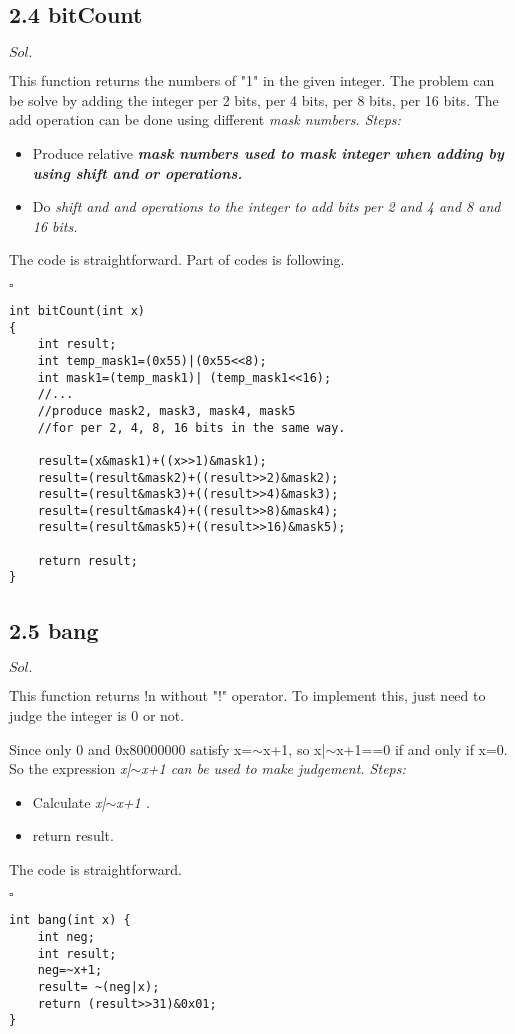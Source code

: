 \documentclass[a4paper, 11pt]{article}
\newenvironment{sol}[1] {\par \noindent $#1.$} {\par \hfill $\square$}
\begin{document}
\subsection*{2.4 bitCount}

\begin{sol}{Sol}

This function returns the numbers of "1" in the given integer. The problem can be solve by adding the integer per 2 bits, per 4 bits, per 8 bits, per 16 bits. The add operation can be done using different \itshape mask \normalfont numbers. Steps:

\begin{itemize}
    \item Produce relative \itshape\bfseries mask \mdseries\normalfont numbers used to mask integer when adding by using \itshape shift \normalfont and \itshape or \normalfont operations.
    \item Do \itshape shift \normalfont and \itshape and \normalfont operations to the integer to add bits per 2 and 4 and 8 and 16 bits.
\end{itemize}

The code is straightforward. Part of codes is following.
\end{sol}
\begin{lstlisting}
int bitCount(int x)
{
    int result;
    int temp_mask1=(0x55)|(0x55<<8);
    int mask1=(temp_mask1)| (temp_mask1<<16);
    //...
    //produce mask2, mask3, mask4, mask5
    //for per 2, 4, 8, 16 bits in the same way.

    result=(x&mask1)+((x>>1)&mask1);
    result=(result&mask2)+((result>>2)&mask2);
    result=(result&mask3)+((result>>4)&mask3);
    result=(result&mask4)+((result>>8)&mask4);
    result=(result&mask5)+((result>>16)&mask5);

    return result;
}
\end{lstlisting}

\subsection*{2.5 bang}

\begin{sol}{Sol}

This function returns !n without "!" operator. To implement this, just need to judge the integer is 0 or not.

Since only 0 and 0x80000000 satisfy x=$\sim$x+1, so x{\big|}$\sim$x+1==0 if and only if x=0. So the expression \itshape x{\big|}$\sim$x+1 \normalfont can be used to make judgement. Steps:

\begin{itemize}
    \item Calculate \itshape x{\big|}$\sim$x+1 \normalfont.
    \item return result.
\end{itemize}

The code is straightforward.
\end{sol}
\begin{lstlisting}
int bang(int x) {
    int neg;
    int result;
    neg=~x+1;
    result= ~(neg|x);
    return (result>>31)&0x01;
}
\end{lstlisting}
\end{document}
